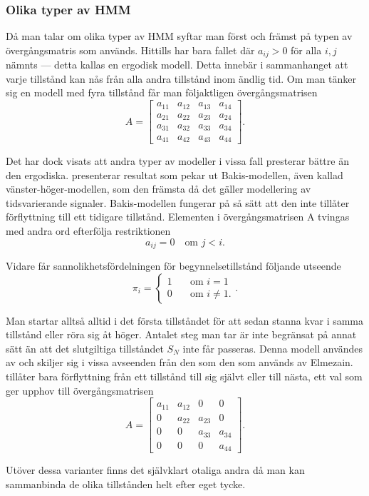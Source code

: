 \documentclass[../rapport_MVEX01-11-05]{subfiles}
\begin{document}
\subsubsection{Olika typer av HMM}
Då man talar om olika typer av HMM syftar man först och främst på
typen av övergångsmatris som används. Hittills har bara 
fallet där $a_{ij} > 0$ för alla $i,j$ nämnts --- detta kallas en ergodisk
modell. Detta innebär i sammanhanget att varje
tillstånd kan nås från alla andra tillstånd inom ändlig tid. Om man
tänker sig en modell med fyra tillstånd får man följaktligen övergångsmatrisen
\begin{equation*}
A = \begin{bmatrix}
a_{11} & a_{12} & a_{13} & a_{14}\\
a_{21} & a_{22} & a_{23} & a_{24}\\
a_{31} & a_{32} & a_{33} & a_{34}\\
a_{41} & a_{42} & a_{43} & a_{44}
\end{bmatrix}.  
\end{equation*} 

Det har dock visats att andra typer av modeller i vissa fall presterar
bättre än den ergodiska. 
presenterar resultat som pekar ut Bakis-modellen, även kallad
vänster-höger-modellen, som den främsta då det gäller modellering
av tidsvarierande signaler. Bakis-modellen fungerar på så sätt att den
inte tillåter förflyttning till ett tidigare tillstånd. Elementen i
övergångsmatrisen A tvingas med andra ord efterfölja restriktionen
\begin{equation*}
a_{ij} = 0 \quad\text{om }j<i.
\end{equation*}

Vidare får sannolikhetsfördelningen för begynnelsetillstånd följande
utseende
\begin{equation*}
\pi_i = \begin{cases}
         1 & \quad\text{om } i = 1\\
         0 & \quad\text{om } i \neq 1.\end{cases}.
\end{equation*}  

Man startar alltså alltid i det första tillståndet för att sedan
stanna kvar i samma tillstånd eller röra sig åt höger. Antalet steg
man tar är inte begränsat på annat sätt än att det slutgiltiga
tillståndet $S_N$ inte får passeras. Denna modell användes av
 och skiljer sig i vissa avseenden från
den som den som används av Elmezain.  tillåter bara
förflyttning från
ett tillstånd till sig självt eller till nästa, ett val som ger upphov
till övergångsmatrisen
\begin{equation*}
A = \begin{bmatrix}
a_{11} & a_{12} & 0 & 0\\
0 & a_{22} & a_{23} & 0\\
0 & 0 & a_{33} & a_{34}\\
0 & 0 & 0 & a_{44}
\end{bmatrix}.  
\end{equation*} 

Utöver dessa varianter finns det självklart otaliga andra då man kan
sammanbinda de olika tillstånden helt efter eget tycke.  
\end{document}
